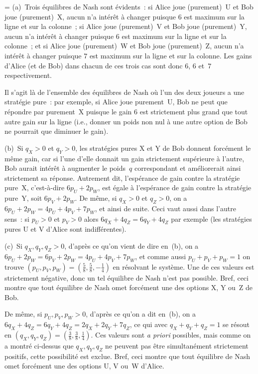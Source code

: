 \documentclass[12pt,a4paper]{article}
\theoremstyle{definition}
\newif\ifcorrige
\newenvironment{corrige}%
{\ifcorrige\relax\else\setbox0=\vbox\bgroup\fi%
\smallbreak\noindent{\underbar{\textit{Corrigé.}}\quad}}
{{\hbox{}\nobreak\hfill\checkmark}%
\ifcorrige\relax\else\egroup\fi\par}
\begin{document}
\begin{corrige}
(a) Trois équilibres de Nash sont évidents : si Alice joue
  (purement) U et Bob joue (purement) X, aucun n'a intérêt à changer
  puisque $6$ est maximum sur la ligne et sur la colonne ; si Alice
  joue (purement) V et Bob joue (purement) Y, aucun n'a intérêt à
  changer puisque $6$ est maximum sur la ligne et sur la colonne ; et
  si Alice joue (purement) W et Bob joue (purement) Z, aucun n'a
  intérêt à changer puisque $7$ est maximum sur la ligne et sur la
  colonne.  Les gains d'Alice (et de Bob) dans chacun de ces trois cas
  sont donc $6$, $6$ et $7$ respectivement.

Il s'agit là de l'ensemble des équilibres de Nash où l'un des deux
joueurs a une stratégie pure : par exemple, si Alice joue purement U,
Bob ne peut que répondre par purement X puisque le gain $6$ est
strictement plus grand que tout autre gain sur la ligne (i.e., donner
un poids non nul à une autre option de Bob ne pourrait que diminuer le
gain).

(b) Si $q_X > 0$ et $q_Y > 0$, les stratégies pures X et Y de Bob
donnent forcément le même gain, car si l'une d'elle donnait un gain
strictement supérieure à l'autre, Bob aurait intérêt à augmenter le
poids $q$ correspondant et améliorerait ainsi strictement sa réponse.
Autrement dit, l'espérance de gain contre la stratégie pure X,
c'est-à-dire $6 p_U + 2 p_W$, est égale à l'espérance de gain contre
la stratégie pure Y, soit $6 p_V + 2 p_W$.  De même, si $q_X > 0$ et
$q_Z > 0$, on a $6 p_U + 2 p_W = 4 p_U + 4 p_V + 7 p_W$, et ainsi de
suite.  Ceci vaut aussi dans l'autre sens : si $p_U > 0$ et $p_V > 0$
alors $6 q_X + 4 q_Z = 6 q_Y + 4 q_Z$ par exemple (les stratégies
pures U et V d'Alice sont indifférentes).

(c) Si $q_X,q_Y,q_Z > 0$, d'après ce qu'on vient de dire en (b), on a
$6 p_U + 2 p_W = 6 p_V + 2 p_W = 4 p_U + 4 p_V + 7 p_W$, et comme
aussi $p_U + p_V + p_W = 1$ on trouve $(p_U, p_V, p_W) = (\frac{5}{8},
\frac{5}{8}, -\frac{1}{4})$ en résolvant le système.  Une de ces
valeurs est strictement négative, donc un tel équilibre de Nash n'est
pas possible.  Bref, ceci montre que tout équilibre de Nash omet
forcément une des options X, Y ou Z de Bob.

De même, si $p_U,p_V,p_W > 0$, d'après ce qu'on a dit en (b), on a $6
q_X + 4 q_Z = 6 q_Y + 4 q_Z = 2 q_X + 2 q_Y + 7 q_Z$, ce qui avec $q_X
+ q_Y + q_Z = 1$ se résout en $(q_X, q_Y, q_Z) = (\frac{3}{8},
\frac{3}{8}, \frac{1}{4})$.  Ces valeurs sont \textit{a priori}
possibles, mais comme on a montré ci-dessus que $q_X,q_Y,q_Z$ ne
peuvent pas être simultanément strictement positifs, cette possibilité
est exclue.  Bref, ceci montre que tout équilibre de Nash omet
forcément une des options U, V ou W d'Alice.


\end{corrige}
\end{document}
